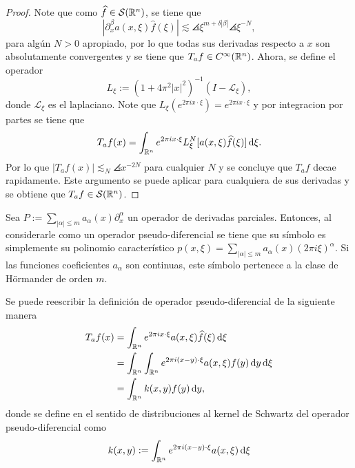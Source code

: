 \begin{proof}
	Note que como $\widehat{f}\in\mathcal{S}(\mathbb{R}^n)$, se tiene que 
	\[|\partial^\beta_xa(x, \xi)\widehat{f}(\xi)|\lesssim \angles{\xi}^{m+\delta|\beta|}\angles{\xi}^{-N} ,\]
	para algún $N>0$ apropiado, por lo que todas sus derivadas respecto a $x$ son absolutamente convergentes y se tiene que $T_af\in C^\infty(\mathbb{R}^n)$. Ahora, se define el operador 
	\begin{equation*}
		L_\xi := (1 + 4\pi^2|x|^2)^{-1}(I-\mathcal{L}_\xi),
	\end{equation*}
	donde $\mathcal{L}_\xi$ es el laplaciano. Note que $ L_\xi(e^{2\pi ix\cdot\xi}) = e^{2\pi ix\cdot \xi} $ y por integracion por partes se tiene que
	\begin{equation*}
		T_af(x) = \int_{\mathbb{R}^n} e^{2\pi ix\cdot \xi}L_\xi^N [a(x,\xi)\widehat{f}(\xi)] \mathop{}\!\mathrm{d} \xi.
	\end{equation*}
	Por lo que $|T_af(x)| \lesssim_N \angles{x}^{-2N}$ para cualquier $N$ y se concluye que $T_af$ decae rapidamente. Este argumento se puede aplicar para cualquiera de sus derivadas y se obtiene que $T_af\in\mathcal{S}(\mathbb{R}^n)$.
\end{proof}
\begin{example}
	Sea $P:=\sum_{|\alpha|\leq m} a_\alpha(x)\partial^\alpha_x$ un operador de derivadas parciales. Entonces, al considerarle como un operador pseudo-diferencial se tiene que su símbolo es simplemente su polinomio característico $p(x,\xi) = \sum_{|\alpha|\leq m} a_\alpha(x)(2\pi i\xi)^\alpha$. Si las funciones coeficientes $a_\alpha$ son continuas, este símbolo pertenece a la clase de Hörmander de orden $m$.
\end{example}
\begin{remark}
		Se puede reescribir la definición de operador pseudo-diferencial de la siguiente manera
		\begin{align*}
			T_af(x) & = \int_{\mathbb{R}^n} e^{2\pi ix\cdot\xi} a(x, \xi)\widehat{f}(\xi)\mathop{}\!\mathrm{d} \xi\\
			& = \int_{\mathbb{R}^n} \int_{\mathbb{R}^n} e^{2\pi i (x-y)\cdot\xi}a(x, \xi)f(y) \mathop{}\!\mathrm{d} y \mathop{}\!\mathrm{d} \xi\\
			& =\int_{\mathbb{R}^n} k(x, y) f(y)\mathop{}\!\mathrm{d} y,
		\end{align*}
		donde se define en el sentido de distribuciones al kernel de Schwartz del operador pseudo-diferencial como
		\begin{equation*}
			k(x, y) := \int_{\mathbb{R}^n} e^{2\pi i (x-y)\cdot\xi}a(x, \xi) \mathop{}\!\mathrm{d} \xi 
		\end{equation*}
\end{remark}
